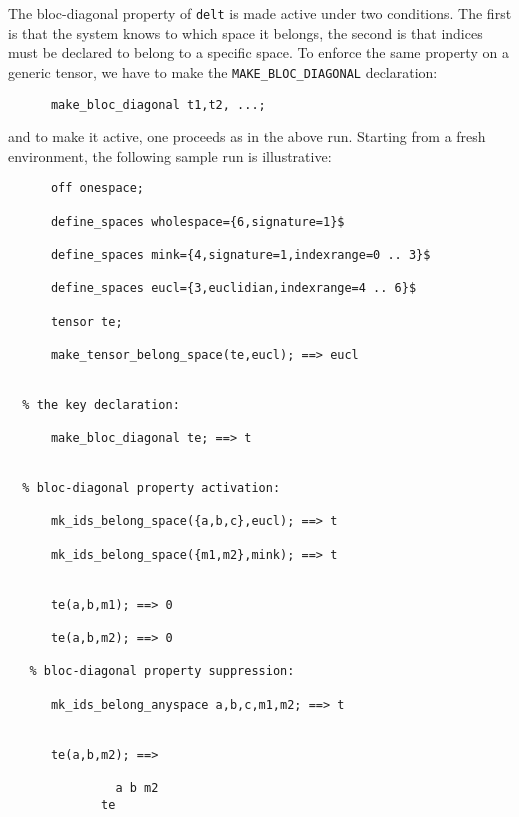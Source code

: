 The bloc-diagonal property of \texttt{delt} is made 
active   under two conditions. The first is that the system knows 
to which space it belongs, the second is that indices must be 
declared to belong to a specific space.
To enforce the same property on a generic tensor, we have to make 
the \texttt{MAKE\_BLOC\_DIAGONAL} declaration:
\begin{verbatim}
      make_bloc_diagonal t1,t2, ...;
\end{verbatim}
and to make it active, one proceeds as in the above run.
Starting from a fresh environment, the following sample run 
is illustrative:
\begin{verbatim}
      off onespace;

      define_spaces wholespace={6,signature=1}$

      define_spaces mink={4,signature=1,indexrange=0 .. 3}$

      define_spaces eucl={3,euclidian,indexrange=4 .. 6}$

      tensor te;

      make_tensor_belong_space(te,eucl); ==> eucl


  % the key declaration:

      make_bloc_diagonal te; ==> t


  % bloc-diagonal property activation:

      mk_ids_belong_space({a,b,c},eucl); ==> t

      mk_ids_belong_space({m1,m2},mink); ==> t


      te(a,b,m1); ==> 0

      te(a,b,m2); ==> 0

   % bloc-diagonal property suppression:

      mk_ids_belong_anyspace a,b,c,m1,m2; ==> t


      te(a,b,m2); ==>

               a b m2
             te

\end{verbatim}

